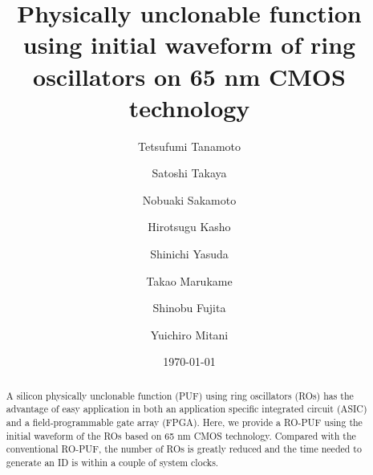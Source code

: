\documentclass[%
reprint, amsmath,amssymb,%
pra,
]{revtex4-1}
\begin{document}
\title{
Physically unclonable function using initial waveform of ring oscillators on 65 nm CMOS technology
}


\author{Tetsufumi Tanamoto}
\author{Satoshi Takaya}%
%
\author{Nobuaki Sakamoto}%
\author{Hirotsugu Kasho}%
%
\author{Shinichi Yasuda}
\author{Takao Marukame}
\author{Shinobu Fujita}
\author{Yuichiro Mitani}
%

\date{\today}




\begin{abstract}
A silicon physically unclonable function (PUF) using ring oscillators (ROs) 
has the advantage of easy application in both an application specific integrated circuit (ASIC) 
and a field-programmable gate array (FPGA). 
Here, we provide a RO-PUF using the initial waveform of the ROs based on 65 nm CMOS technology.
Compared with the conventional RO-PUF, 
the number of ROs is greatly reduced and the time 
needed to generate an ID is within a couple of system clocks.
\end{abstract} 

\maketitle
\end{document}
